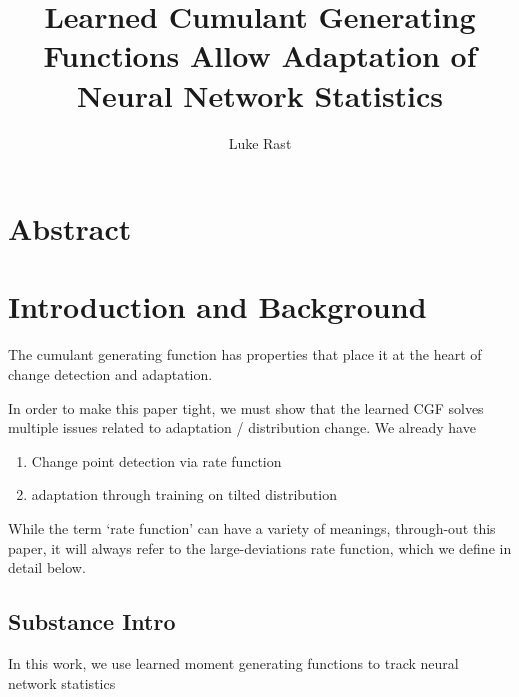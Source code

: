 \documentclass[10pt]{article}      %
\begin{document}
\title{Learned Cumulant Generating Functions Allow Adaptation of Neural Network Statistics}
\author{Luke Rast}
\maketitle
\linenumbers


\section{Abstract}






\section{Introduction and Background}


The cumulant generating function has properties that place it at the heart of change detection and adaptation.




In order to make this paper tight, we must show that the learned CGF solves multiple issues related to adaptation / distribution change.
We already have
\begin{enumerate}
  \item Change point detection via rate function
  \item adaptation through training on tilted distribution
\end{enumerate}



While the term `rate function' can have a variety of meanings, through-out this paper, it will always refer to the large-deviations rate function, which we define in detail below.





\subsection{Substance Intro}


In this work, we use learned moment generating functions to track neural network statistics 
\end{document}
